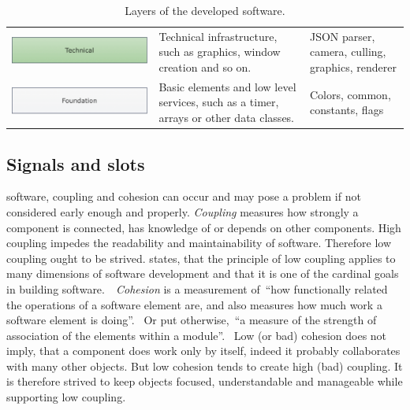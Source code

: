 \documentclass[%
    a4paper,    %
    justified,  %
    nobib,      %
    openany     %
]{tufte-book}
\begin{document}
\begin{table}[h]
\begin{tabularx}{\textwidth}{XXX}
    \includegraphics[width=1.0\linewidth]{images/layers-technical}   & Technical infrastructure, such as graphics, window creation and so on.                & JSON parser, camera, culling, graphics, renderer                            \\
    \includegraphics[width=1.0\linewidth]{images/layers-foundation}  & Basic elements and low level services, such as a timer, arrays or other data classes. & Colors, common, constants, flags                                            \\
    \bottomrule
  \end{tabularx}
  \vspace*{\baselineskip}
  \caption{Layers of the developed software.}
  \label{table:results:layers}
\end{table}

\subsection{Signals and slots}
\label{results:subsec:signals}


 software, coupling and cohesion
can occur and may pose a problem if not considered early enough and properly.
\textit{Coupling} measures how strongly a component is connected, has knowledge
of or depends on other components. High coupling impedes the readability and
maintainability of software. Therefore low coupling ought to be strived.
\citeauthor{larman-applying-2004} states, that the principle of low coupling
applies to many dimensions of software development and that it is one of the
cardinal goals in building
software.~\cite{larman-applying-2004}~\textit{Cohesion} is a measurement
of~\enquote{how functionally related the operations of a software element are,
and also measures how much work a software element is
doing}.~\cite{larman-applying-2004} Or put otherwise,~\enquote{a measure of the
strength of association of the elements within a module}.~\cite[p.
52]{ieee-swebok-2014} Low (or bad) cohesion does not imply, that a component
does work only by itself, indeed it probably collaborates with many other
objects. But low cohesion tends to create high (bad) coupling. It is therefore
strived to keep objects focused, understandable and manageable while supporting
low coupling.~\cite{larman-applying-2004}
\end{document}
